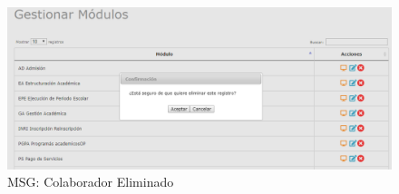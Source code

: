 \begin{enumerate}
			\begin{figure}[htbp!]
				\begin{center}
					\includegraphics[scale=0.6]{roles/lider/modulos/pantallas/IU5-3MSG10}
					\caption{MSG: Colaborador Eliminado}
					\label{fig:moduloEliminado}
				\end{center}
			\end{figure}
			\end{enumerate}